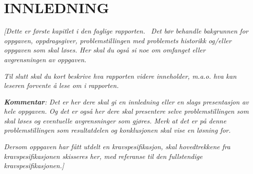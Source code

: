 \documentclass[../main.tex]{subfiles}
\begin{document}
\clearpage\section{INNLEDNING}

\bigskip

{\itshape\color{blue}
[Dette er f{\o}rste kapitlet i den faglige rapporten. \ Det b{\o}r behandle bakgrunnen for oppgaven, oppdragsgiver,
problemstillingen med problemets historikk og/eller oppgaven som skal l{\o}ses. Her skal du ogs{\aa} si noe om omfanget
eller avgrensningen av oppgaven.}

{\itshape\color{blue}
Til slutt skal du kort beskrive hva rapporten videre inneholder, m.a.o. hva kan leseren forvente {\aa} lese om i
rapporten.}

{\itshape\color{blue}
\textbf{\textup{Kommentar}}: Det er her dere skal gi en innledning eller en slags presentasjon av hele oppgaven. Og det
er ogs{\aa} her dere skal presentere selve problemstillingen som skal l{\o}ses og eventuelle avgrensninger som
gj{\o}res. Merk at det er p{\aa} denne problemstillingen som resultatdelen og konklusjonen skal vise en l{\o}sning for.
}

{\itshape\color{blue}
Dersom oppgaven har f{\aa}tt utdelt en kravspesifikasjon, skal hovedtrekkene fra kravspesifikasjonen skisseres her, med
referanse til den fullstendige kravspesifikasjonen.]}


\bigskip
\end{document}
